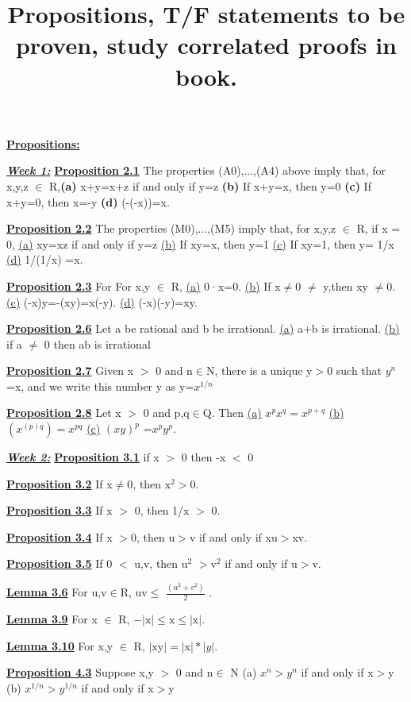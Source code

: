 \documentclass[10pt]{article}
\title{\textbf{Propositions, T/F statements to be proven, study correlated proofs in book.}}
\begin{document}
\fontsize{14}{10}\textbf{\underline{Propositions:}}
\fontsize{12}{10}
\par
\textbf{\textit{\underline{Week 1:}}}
\textbf{\underline{Proposition 2.1}}
The properties (A0),...,(A4) above imply that, for x,y,z $\in$ R,\textbf{(a)} x+y=x+z if and only if y=z \textbf{(b)}  If x+y=x, then y=0
\textbf{(c)} If x+y=0, then x=-y \textbf{(d)} (-(-x))=x.
\par
\textbf{\underline{Proposition 2.2}}
The properties (M0),...,(M5) imply that, for x,y,z $\in$ R, if x = 0, \underline{(a)} xy=xz if and only if y=z \underline{(b)}
If xy=x, then y=1 \underline{(c)} If xy=1, then y= 1/x \underline{(d)} 1/(1/x) =x.
\par
\textbf{\underline{Proposition 2.3}}
For For x,y $\in$ R, \underline{(a)}  0·x=0. \underline{(b)} If x$\neq$0 $\neq$ y,then xy $\neq $0.
\underline{(c)} (-x)y=-(xy)=x(-y). \underline{(d)} (-x)(-y)=xy.
\par
\textbf{\underline{Proposition 2.6}}
Let a be rational and b be irrational. \underline{(a)} a+b is irrational. \underline{(b)} if a $\neq $ 0 then ab is irrational
\par
\textbf{\underline{Proposition 2.7}}
Given x $>$ 0 and n$\in$N, there is a unique y$>$0 such that $y^n$ =x, and we
write this number y as y=$x^{1/n}$
\par
\textbf{\underline{Proposition 2.8}}
Let x $>$ 0 and p,q$\in$Q. Then \underline{(a)} $x^{p}x^{q} =x^{p+q}$ \underline{(b)} $(x^{(p)q}) =x^{pq}$ \underline{(c)}
 $(xy)^{p}$ =$x^{p}y^{p}$.
\par
\textbf{\textit{\underline{Week 2:}}}
\textbf{\underline{Proposition 3.1}}
if x $>$ 0 then -x $<$ 0
\par
\textbf{\underline{Proposition 3.2}}
If x$\neq$0, then $\mbox{x}^2 >$0.
\par
\textbf{\underline{Proposition 3.3}}
If x $>$ 0, then 1/x $>$ 0.
\par
\textbf{\underline{Proposition 3.4}}
If x $>$0, then u$>$v if and only if xu$>$xv.
\par
\textbf{\underline{Proposition 3.5}}
If 0 $<$ u,v, then u$^2$ $>$v$^2$ if and only if u$>$v.
\par
\textbf{\underline{Lemma 3.6}}
For u,v$\in$R,
 uv$\leq$ $\frac{(u^2+v^2)}{2}$ .

\par
\textbf{\underline{Lemma 3.9}}
For x $\in$ R,
$ -|\mbox{x}| \leq \mbox{x} \leq |\mbox{x}|.$
\par
\textbf{\underline{Lemma 3.10}}
For x,y $\in$ R, $|\mbox{xy}| = |\mbox{x}| * |y|.$
\par
\textbf{\underline{Proposition 4.3}}
Suppose x,y $>$ 0 and n$\in$ N
(a) $x^n > y^n $ if and only if x$>$y
(b) $x^{1/n} > y^{1/n}$ if and only if x$>$y
\end{document}
